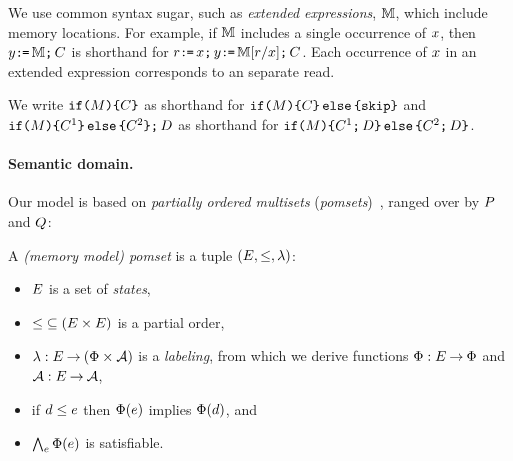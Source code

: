 We use common syntax sugar, such as \emph{extended expressions}, $\mathbb{M}$,
which include memory locations.  For example, if $\mathbb{M}$ includes a single
occurrence of $x$, then $y\texttt{:}\mkern-1mu\texttt{=}\,\mathbb{M}\texttt{;}\,\allowbreak C$ is shorthand for
$r\texttt{:}\mkern-1mu\texttt{=}\,x\texttt{;}\,\allowbreak y\texttt{:}\mkern-1mu\texttt{=}\,\mathbb{M}[r/x]\texttt{;}\,\allowbreak C$.  Each
occurrence of $x$ in an extended expression corresponds to an separate
read.

We write
$\texttt{if}\allowbreak\texttt{(}M\texttt{)} \allowbreak\texttt{\{} C \texttt{\}}$ as shorthand for
$\texttt{if}\allowbreak\texttt{(}M\texttt{)} \allowbreak\texttt{\{} C\texttt{\}}\,\allowbreak\texttt{else}\allowbreak\,\texttt{\{} \texttt{skip}\texttt{\}}$ and
$\texttt{if}\allowbreak\texttt{(}M\texttt{)} \allowbreak\texttt{\{} C^1 \texttt{\}}\,\allowbreak\texttt{else}\allowbreak\,\texttt{\{} C^2 \texttt{\}} \texttt{;}\,\allowbreak D$ as shorthand for
$\texttt{if}\allowbreak\texttt{(}M\texttt{)} \allowbreak\texttt{\{} C^1 \texttt{;}\,\allowbreak D\texttt{\}}\,\allowbreak\texttt{else}\allowbreak\,\texttt{\{} C^2 \texttt{;}\,\allowbreak D\texttt{\}}$.

\paragraph{Semantic domain.}
Our model is based on \emph{partially ordered multisets}
(\emph{pomsets})~\cite{GISCHER1988199}, ranged over by $P$ and $Q$:
\begin{definition}
  \label{def:mmpomset}
  A \emph{(memory model) pomset} is a tuple
  $(\Event, {\le}, %
  \labeling)$: %
  \begin{itemize}
  \item $E$ is a set of \emph{states},
  \item ${\le} \subseteq (E\times E)$ is a partial order, 
  \item $\lambda: E \mathbin\rightarrow (\Phi\times\mathcal{A})$ is a \emph{labeling},
    from which we derive functions $\Phi:E\mathbin\rightarrow\Phi$ and $\mathcal{A}:E\mathbin\rightarrow\mathcal{A}$,
  \item if $d\le e$ then $\Phi(e)$ implies
    $\Phi(d)$, and
  \item $\bigwedge_{e}\Phi(e)$ is satisfiable.
  \end{itemize}
\end{definition}

